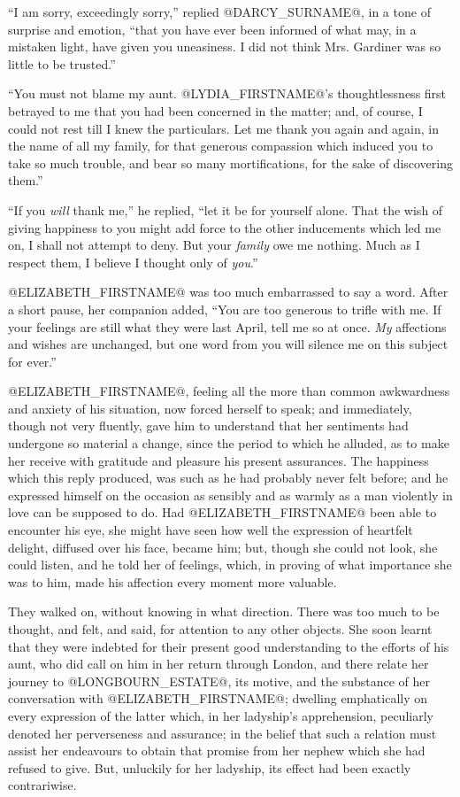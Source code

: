``I am sorry, exceedingly sorry,'' replied @DARCY_SURNAME@, in a tone of surprise
and emotion, ``that you have ever been informed of what may, in a
mistaken light, have given you uneasiness. I did not think Mrs. Gardiner
was so little to be trusted.''

``You must not blame my aunt. @LYDIA_FIRSTNAME@'s thoughtlessness first betrayed to
me that you had been concerned in the matter; and, of course, I could
not rest till I knew the particulars. Let me thank you again and again,
in the name of all my family, for that generous compassion which induced
you to take so much trouble, and bear so many mortifications, for the
sake of discovering them.''

``If you \textit{will} thank me,'' he replied, ``let it be for yourself alone.
That the wish of giving happiness to you might add force to the other
inducements which led me on, I shall not attempt to deny. But your
\textit{family} owe me nothing. Much as I respect them, I believe I thought
only of \textit{you}.''

@ELIZABETH_FIRSTNAME@ was too much embarrassed to say a word. After a short pause,
her companion added, ``You are too generous to trifle with me. If your
feelings are still what they were last April, tell me so at once. \textit{My}
affections and wishes are unchanged, but one word from you will silence
me on this subject for ever.''

@ELIZABETH_FIRSTNAME@, feeling all the more than common awkwardness and anxiety of
his situation, now forced herself to speak; and immediately, though not
very fluently, gave him to understand that her sentiments had undergone
so material a change, since the period to which he alluded, as to make
her receive with gratitude and pleasure his present assurances. The
happiness which this reply produced, was such as he had probably never
felt before; and he expressed himself on the occasion as sensibly and as
warmly as a man violently in love can be supposed to do. Had @ELIZABETH_FIRSTNAME@
been able to encounter his eye, she might have seen how well the
expression of heartfelt delight, diffused over his face, became him;
but, though she could not look, she could listen, and he told her of
feelings, which, in proving of what importance she was to him, made his
affection every moment more valuable.

They walked on, without knowing in what direction. There was too much to
be thought, and felt, and said, for attention to any other objects. She
soon learnt that they were indebted for their present good understanding
to the efforts of his aunt, who did call on him in her return through
London, and there relate her journey to @LONGBOURN_ESTATE@, its motive, and the
substance of her conversation with @ELIZABETH_FIRSTNAME@; dwelling emphatically on
every expression of the latter which, in her ladyship's apprehension,
peculiarly denoted her perverseness and assurance; in the belief that
such a relation must assist her endeavours to obtain that promise
from her nephew which she had refused to give. But, unluckily for her
ladyship, its effect had been exactly contrariwise.

